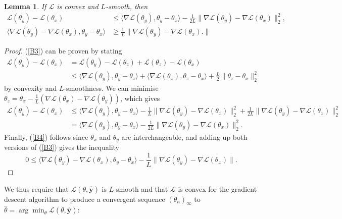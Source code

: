 \documentclass[a4paper,11pt,titlepage]{article}
\theoremstyle{definition}
\theoremstyle{plain}
\newtheorem{lemma}[theorem]{Lemma}
\theoremstyle{remark}
\begin{document}
\begin{lemma}
    If $\mathcal{L}$ is convex and $L$-smooth, then
    \begin{align}
        \mathcal{L}(\theta_y) - \mathcal{L}(\theta_x) &\leq \langle \nabla \mathcal{L}(\theta_y), \theta_y - \theta_x \rangle - \frac{1}{2L} \|\nabla \mathcal{L}(\theta_y) - \nabla \mathcal{L}(\theta_x) \|_2^2, \label{B3} \\
        \langle \nabla \mathcal{L}(\theta_y) - \nabla \mathcal{L}(\theta_x), \theta_y - \theta_x \rangle &\geq \frac{1}{L} \|\nabla \mathcal{L}(\theta_y) - \nabla \mathcal{L}(\theta_x). \| \label{B4}
    \end{align}
\end{lemma}
\begin{proof}
    (\ref{B3}) can be proven by stating
    \begin{align*}
        \mathcal{L}(\theta_y) - \mathcal{L}(\theta_x) &= \mathcal{L}(\theta_y) - \mathcal{L}(\theta_z) + \mathcal{L}(\theta_z) -\mathcal{L}(\theta_x) \\
        &\leq \langle \nabla \mathcal{L}(\theta_y), \theta_y - \theta_z \rangle + \langle \nabla \mathcal{L}(\theta_x), \theta_z - \theta_x \rangle + \frac{L}{2} \|\theta_z - \theta_x\|_2^2
    \end{align*}
    by convexity and $L$-smoothness. We can minimise $\theta_z = \theta_x - \frac{1}{L}(\nabla \mathcal{L}(\theta_x) - \nabla \mathcal{L}(\theta_y))$, which gives
    \begin{align*}
        \mathcal{L}(\theta_y) - \mathcal{L}(\theta_x) &\leq \langle \nabla \mathcal{L}(\theta_y), \theta_y - \theta_x \rangle - \frac{1}{L} \|\nabla \mathcal{L}(\theta_y) - \nabla \mathcal{L}(\theta_x) \|_2^2 + \frac{1}{2L} \|\nabla \mathcal{L}(\theta_y) - \nabla \mathcal{L}(\theta_x) \|_2^2 \\
        &= \langle \nabla \mathcal{L}(\theta_y), \theta_y - \theta_x \rangle - \frac{1}{2L} \|\nabla \mathcal{L}(\theta_y) - \nabla \mathcal{L}(\theta_x) \|_2^2.
    \end{align*}
    Finally, (\ref{B4}) follows since $\theta_x$ and $\theta_y$ are interchangeable, and adding up both versions of (\ref{B3}) gives the inequality
    $$
    0 \leq \langle \nabla \mathcal{L}(\theta_y) - \nabla \mathcal{L}(\theta_x), \theta_y - \theta_x \rangle - \frac{1}{L} \|\nabla \mathcal{L}(\theta_y) - \nabla \mathcal{L}(\theta_x) \|.
    $$
\end{proof}

We thus require that $\mathcal{L}(\theta, \mathbf{\hat{y}})$ is $L$-smooth and that $\mathcal{L}$ is convex for the gradient descent algorithm to produce a convergent sequence $(\theta_n)_\infty$ to $\hat{\theta} = \arg\min_\theta \mathcal{L}(\theta, \mathbf{\hat{y}})$:
\end{document}
